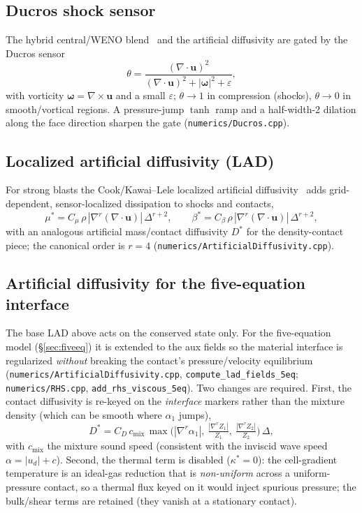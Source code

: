\documentclass[11pt]{article}
\newcommand{\uvec}{\mathbf{u}}
\newcommand{\code}[1]{\texttt{#1}}
\begin{document}
\subsection{Ducros shock sensor}
The hybrid central/WENO blend~\cite{pirozzoli_2002} and the artificial diffusivity are gated by the
Ducros sensor~\cite{ducros_1999}
\begin{equation}
\theta = \frac{(\nabla\!\cdot\uvec)^2}{(\nabla\!\cdot\uvec)^2 + |\boldsymbol{\omega}|^2 + \varepsilon},
\end{equation}
with vorticity $\boldsymbol{\omega}=\nabla\times\uvec$ and a small $\varepsilon$;
$\theta\to1$ in compression (shocks), $\theta\to0$ in smooth/vortical regions. A
pressure-jump $\tanh$ ramp and a half-width-2 dilation along the face direction
sharpen the gate (\code{numerics/Ducros.cpp}).

\subsection{Localized artificial diffusivity (LAD)}
For strong blasts the Cook/Kawai--Lele localized artificial diffusivity~\cite{cook_2007,kawai_lele_2008} adds
grid-dependent, sensor-localized dissipation to shocks and contacts,
\begin{equation}
\mu^\ast = C_\mu\,\rho\,|\nabla^r(\nabla\!\cdot\uvec)|\,\Delta^{r+2},
\qquad
\beta^\ast = C_\beta\,\rho\,|\nabla^r(\nabla\!\cdot\uvec)|\,\Delta^{r+2},
\end{equation}
with an analogous artificial mass/contact diffusivity $D^\ast$ for the
density-contact piece; the canonical order is $r=4$ (\code{numerics/ArtificialDiffusivity.cpp}).

\subsection{Artificial diffusivity for the five-equation interface}
\label{sec:lad5eq}
The base LAD above acts on the conserved state only. For the five-equation model
(\S\ref{sec:fiveeq}) it is extended to the aux fields so the material interface is
regularized \emph{without} breaking the contact's pressure/velocity equilibrium
(\code{numerics/ArtificialDiffusivity.cpp}, \code{compute\_lad\_fields\_5eq};
\code{numerics/RHS.cpp}, \code{add\_rhs\_viscous\_5eq}). Two changes are required.
First, the contact diffusivity is re-keyed on the \emph{interface} markers rather
than the mixture density (which can be smooth where $\alpha_1$ jumps),
\begin{equation}
D^\ast = C_D\,c_{\mathrm{mix}}\,
  \max\!\Big(|\nabla^r\alpha_1|,\ \tfrac{|\nabla^r Z_1|}{Z_1},\ \tfrac{|\nabla^r Z_2|}{Z_2}\Big)\,\Delta,
\end{equation}
with $c_{\mathrm{mix}}$ the mixture sound speed (consistent with the inviscid
wave speed $\alpha=|u_d|+c$). Second, the thermal term is disabled
($\kappa^\ast=0$): the cell-gradient temperature is an ideal-gas reduction that is
\emph{non-uniform} across a uniform-pressure contact, so a thermal flux keyed on
it would inject spurious pressure; the bulk/shear terms are retained (they vanish
at a stationary contact).
\end{document}
